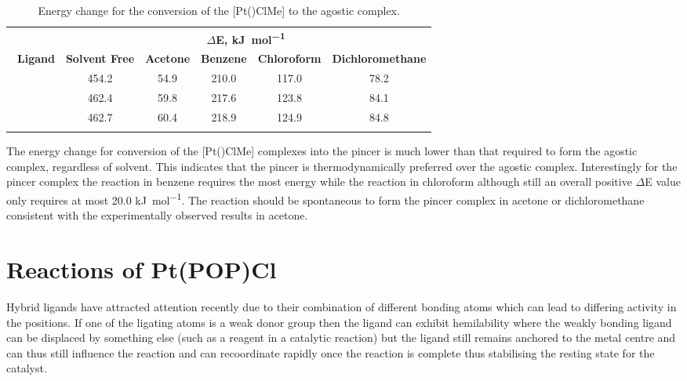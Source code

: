 \begin{table}[htbp]
\caption[Energy change for the conversion of the [Pt(\tBuxantphos)ClMe{]} to the agostic complex]{Energy change for the conversion of the [Pt(\tBuxantphos)ClMe{]} to the agostic complex.}
\vspace{1em}
\label{table:PtClMe-Agostic}
	\small
	\begin{center}
\begin{tabular}{l c c c c c}
	\toprule
	~ & \multicolumn{5}{c}{\bfseries{$\Delta$E, \si{\kilo\joule\per\mole}}} \\
	\cmidrule(lr){2-6} 
	~\bfseries{Ligand} & \bfseries{Solvent Free} & \bfseries{Acetone} &\bfseries{Benzene}&\bfseries{Chloroform} & \bfseries{Dichloromethane} \\
	\midrule		
	~\tBusixantphos 	& 454.2	& 54.9	& 210.0	& 117.0	& 78.2\\
	~\tButhixantphos	& 462.4	& 59.8	& 217.6	& 123.8	& 84.1\\
	~\tBuxantphos		& 462.7	& 60.4	& 218.9	& 124.9	& 84.8\\
	\bottomrule{}
\end{tabular}
\end{center}
\end{table}

The energy change for conversion of the [Pt(\tBuxantphos)ClMe] complexes into the pincer is much lower than that required to form the agostic complex, regardless of solvent.  This indicates that the pincer is thermodynamically preferred over the agostic complex.  Interestingly for the pincer complex the reaction in benzene requires the most energy while the reaction in chloroform although still an overall positive $\Delta$E value only requires at most 20.0 \si{\kilo\joule\per\mole}.  The reaction should be spontaneous to form the pincer complex in acetone or dichloromethane consistent with the experimentally observed results in acetone.
	


\section{Reactions of Pt(POP)Cl}

Hybrid ligands have attracted attention recently due to their combination of different bonding atoms which can lead to differing activity in the \trans{} positions.  If one of the ligating atoms is a weak donor group then the ligand can exhibit hemilability where the weakly bonding ligand can be displaced by something else (such as a reagent in a catalytic reaction) but the ligand still remains anchored to the metal centre and can thus still influence the reaction and can recoordinate rapidly once the reaction is complete thus stabilising the resting state for the catalyst.  

